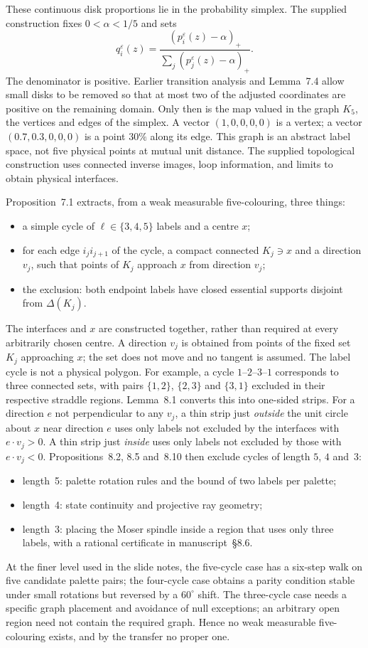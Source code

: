\documentclass[11pt]{article}
\theoremstyle{definition}
\theoremstyle{remark}
\begin{document}
These continuous disk proportions lie in the probability simplex. The supplied
construction fixes $0<\alpha<1/5$ and sets
\[
q_i^\varepsilon(z)=
\frac{(p_i^\varepsilon(z)-\alpha)_+}
{\sum_j(p_j^\varepsilon(z)-\alpha)_+}.
\]
The denominator is positive. Earlier transition analysis and Lemma~7.4 allow
small disks to be removed so that at most two of the adjusted coordinates are
positive on the remaining domain. Only then is the map valued in the graph
$K_5$, the vertices and edges of the simplex. A vector $(1,0,0,0,0)$ is a
vertex; a vector $(0.7,0.3,0,0,0)$ is a point $30\%$ along its edge.
This graph is an abstract label space, not five physical points at mutual
unit distance. The supplied topological construction uses connected inverse
images, loop information, and limits to obtain physical interfaces.

Proposition~7.1 extracts, from a weak measurable five-colouring, three things:
\begin{itemize}
\item a simple cycle of $\ell\in\{3,4,5\}$ labels and a centre $x$;
\item for each edge $i_ji_{j+1}$ of the cycle, a compact connected $K_j\ni x$ and a direction $v_j$, such that points of $K_j$ approach $x$ from direction $v_j$;
\item the exclusion: both endpoint labels have closed essential supports disjoint from $\Delta(K_j)$.
\end{itemize}
The interfaces and $x$ are constructed together, rather than required at every
arbitrarily chosen centre. A direction $v_j$ is obtained from points of the
fixed set $K_j$ approaching $x$; the set does not move and no tangent is assumed.
The label cycle is not a physical polygon. For example, a cycle $1$--$2$--$3$--$1$
corresponds to three connected sets, with pairs $\{1,2\}$, $\{2,3\}$ and
$\{3,1\}$ excluded in their respective straddle regions.
Lemma~8.1 converts this into one-sided strips. For a direction $e$ not perpendicular to any $v_j$, a thin strip just \emph{outside} the unit circle about $x$ near direction $e$ uses only labels not excluded by the interfaces with $e\cdot v_j>0$. A thin strip just \emph{inside} uses only labels not excluded by those with $e\cdot v_j<0$. Propositions~8.2, 8.5 and~8.10 then exclude cycles of length $5$, $4$ and~$3$:
\begin{itemize}
\item length~5: palette rotation rules and the bound of two labels per palette;
\item length~4: state continuity and projective ray geometry;
\item length~3: placing the Moser spindle inside a region that uses only three labels, with a rational certificate in manuscript~\S8.6.
\end{itemize}
At the finer level used in the slide notes, the five-cycle case has a six-step
walk on five candidate palette pairs; the four-cycle case obtains a parity
condition stable under small rotations but reversed by a $60^\circ$ shift.
The three-cycle case needs a specific graph placement and avoidance of null
exceptions; an arbitrary open region need not contain the required graph.
Hence no weak measurable five-colouring exists, and by the transfer no proper one.
\end{document}
